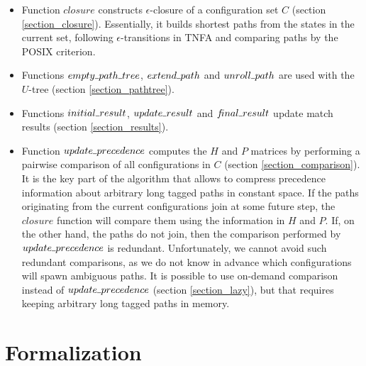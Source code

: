 \documentclass[AMA,STIX1COL]{WileyNJD-v2}
\newcommand{\Xund}{\rule{.4em}{.4pt}}
\begin{document}
\begin{itemize}[itemsep=0.2em, topsep=0.5em]
    \item Function $closure$ constructs $\epsilon$-closure of a configuration set $C$ (section \ref{section_closure}).
        Essentially, it builds shortest paths from the states in the current set,
        following $\epsilon$-transitions in TNFA
        and comparing paths by the POSIX criterion.

    \item Functions $empty \Xund path \Xund tree$, $extend \Xund path$ and $unroll \Xund path$
        are used with the $U$-tree
        (section \ref{section_pathtree}).

    \item Functions $initial \Xund result$, $update \Xund result$ and $f\!inal \Xund result$
        update match results (section \ref{section_results}).

    \item Function $update \Xund precedence$ computes the $H$ and $P$ matrices
        by performing a pairwise comparison of all configurations in $C$ (section \ref{section_comparison}).
        It is the key part of the algorithm that allows to compress precedence information about arbitrary long tagged paths in constant space.
        If the paths originating from the current configurations join at some future step,
        the $closure$ function will compare them using the information in $H$ and $P$.
        If, on the other hand, the paths do not join, then the comparison performed by $update \Xund precedence$ is redundant.
        Unfortunately, we cannot avoid such redundant comparisons,
        as we do not know in advance which configurations will spawn ambiguous paths.
        It is possible to use on-demand comparison instead of $update \Xund precedence$ (section \ref{section_lazy}),
        but that requires keeping arbitrary long tagged paths in memory.
    \\[-0.5em]
\end{itemize}


\section{Formalization}\label{section_formalization}
\end{document}
